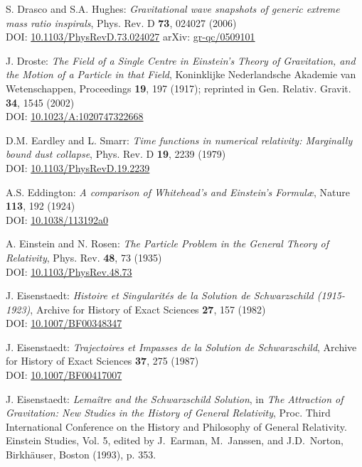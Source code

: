 \begin{thebibliography}{123}
S. Drasco and S.A. Hughes:
{\em Gravitational wave snapshots of generic extreme mass ratio inspirals},
Phys. Rev. D {\bf 73}, 024027 (2006)\\
DOI: \href{https://doi.org/10.1103/PhysRevD.73.024027}{10.1103/PhysRevD.73.024027}\hfill
arXiv: \href{https://arxiv.org/abs/gr-qc/0509101}{gr-qc/0509101}

J. Droste:
{\em The Field of a Single Centre in Einstein's Theory of Gravitation, and the Motion of a Particle in that Field},
Koninklijke Nederlandsche Akademie van Wetenschappen, Proceedings {\bf 19}, 197 (1917);
reprinted in Gen. Relativ. Gravit. {\bf 34}, 1545 (2002)\\
DOI: \href{https://doi.org/10.1023/A:1020747322668}{10.1023/A:1020747322668}

D.M. Eardley and L. Smarr:
{\em Time functions in numerical relativity: Marginally bound dust collapse},
Phys. Rev. D {\bf 19}, 2239 (1979) \\
DOI: \href{https://doi.org/10.1103/PhysRevD.19.2239}{10.1103/PhysRevD.19.2239}

A.S. Eddington: {\em A comparison of Whitehead's and Einstein's Formul\ae},
Nature {\bf 113}, 192 (1924) \\
DOI: \href{https://doi.org/10.1038/113192a0}{10.1038/113192a0}

A. Einstein and N. Rosen:
{\em The Particle Problem in the General Theory of Relativity},
Phys. Rev. {\bf 48}, 73 (1935) \\
DOI: \href{https://doi.org/10.1103/PhysRev.48.73}{10.1103/PhysRev.48.73}

J. Eisenstaedt:
{\em Histoire et Singularit\'es de la Solution de Schwarzschild (1915-1923)},
Archive for History of Exact Sciences {\bf 27}, 157 (1982) \\
DOI: \href{https://doi.org/10.1007/BF00348347}{10.1007/BF00348347}

J. Eisenstaedt:
{\em Trajectoires et Impasses de la Solution de Schwarzschild},
Archive for History of Exact Sciences {\bf 37}, 275 (1987) \\
DOI: \href{https://doi.org/10.1007/BF00417007}{10.1007/BF00417007}

J. Eisenstaedt: {\em Lemaître and the Schwarzschild Solution}, in
{\em The Attraction of Gravitation: New Studies in the History of
General Relativity}, Proc. Third International Conference on the History and Philosophy of General Relativity. Einstein
Studies, Vol. 5, edited by J.~Earman, M.~Janssen, and J.D.~Norton,
Birkhäuser, Boston (1993), p. 353.


\end{thebibliography}
